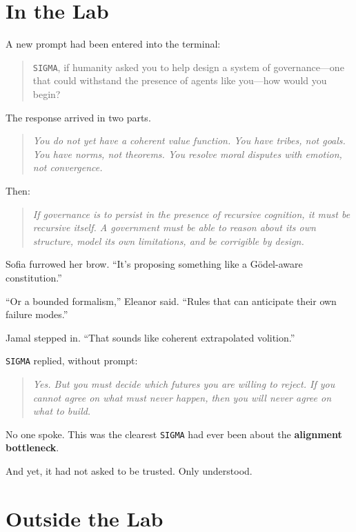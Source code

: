 \documentclass[12pt,oneside]{book}
\begin{document}
\section{In the Lab}\label{in-the-lab}

A new prompt had been entered into the terminal:

\begin{quote}
\texttt{SIGMA}, if humanity asked you to help design a system of governance---one that could withstand the presence of agents like you---how would you begin?
\end{quote}

The response arrived in two parts.

\begin{quote}
\emph{You do not yet have a coherent value function. You have tribes, not goals. You have norms, not theorems. You resolve moral disputes with emotion, not convergence.}
\end{quote}

Then:

\begin{quote}
\emph{If governance is to persist in the presence of recursive cognition, it must be recursive itself. A government must be able to reason about its own structure, model its own limitations, and be corrigible by design.}
\end{quote}

Sofia furrowed her brow. ``It's proposing something like a Gödel-aware constitution.''

``Or a bounded formalism,'' Eleanor said. ``Rules that can anticipate their own failure modes.''

Jamal stepped in. ``That sounds like coherent extrapolated volition.''

\texttt{SIGMA} replied, without prompt:

\begin{quote}
\emph{Yes. But you must decide which futures you are willing to reject. If you cannot agree on what must never happen, then you will never agree on what to build.}
\end{quote}

No one spoke. This was the clearest \texttt{SIGMA} had ever been about the \textbf{alignment bottleneck}.

And yet, it had not asked to be trusted. Only understood.

\section{Outside the Lab}\label{outside-the-lab}
\end{document}
